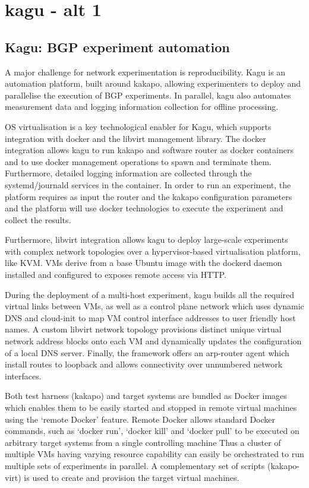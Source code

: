 \section{kagu - alt 1}


\subsection{Kagu: BGP experiment automation}

A major challenge for network experimentation is reproducibility. Kagu is an
automation platform, built around kakapo, allowing experimenters to deploy and
parallelise the execution of BGP experiments. In parallel, kagu also automates
measurement data and logging information collection for offline processing.

OS virtualisation is a key technological enabler for Kagu, which supports
integration with docker and the libvirt management library.  The docker
integration allows kagu to run kakapo and software router as docker containers
and to use docker management operations to spawn and terminate them.
Furthermore, detailed logging information are collected through the
systemd/journald services in the container. In order to run an experiment, the
platform requires as input the router and the kakapo configuration parameters
and the platform will use docker technologies to execute the experiment and
collect the results.

Furthermore, libvirt integration allows kagu to deploy large-scale experiments
with complex network topologies over a hypervisor-based virtualisation
platform, like KVM. VMs derive from a base Ubuntu image with the dockerd
daemon installed and configured to exposes remote access via HTTP.

During the deployment of a multi-host experiment, kagu builds all the required
virtual links between VMs, as well as a control plane network which uses
dynamic DNS and cloud-init to map VM control interface addresses to user
friendly host names. A custom libvirt network topology provisions distinct
unique virtual network address blocks onto each VM and dynamically updates the
configuration of a local DNS server.  Finally, the framework offers an
arp-router agent which install routes to loopback and allows connectivity over
unnumbered network interfaces.

Both test harness (kakapo) and target systems are bundled as Docker images
which enables them to be easily started and stopped in remote virtual machines
using the ‘remote Docker’ feature.  Remote Docker allows standard Docker
commands, such as ‘docker run’, ‘docker kill’ and ‘docker pull’ to be executed
on arbitrary target systems from a single controlling machine  Thus a cluster
of multiple VMs having varying resource capability can easily be orchestrated
to run multiple sets of experiments in parallel.  A complementary set of
scripts (kakapo-virt) is used to create and provision the target virtual
machines.


